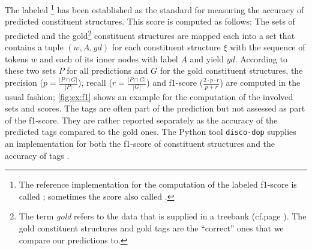 \documentclass[../document.tex]{subfiles}
\begin{document}
    The labeled \footnote{
        The reference implementation for the computation of the labeled f1-score is called  \citep{Black91}; sometimes the score also called .
    } \citep{Black91,Col97} has been established as the standard for measuring the accuracy of predicted constituent structures.
    This score is computed as follows:
    The sets of predicted and the gold\footnote{
        The term \emph{gold} refers to the data that is supplied in a treebank (cf.\@ page \pageref{pg:def:gold}).
        The gold constituent structures and gold  tags are the ``correct'' ones  that we compare our predictions to.
    } constituent structures are mapped each into a set that contains a tuple \((w, A, \mathit{yd})\) for each constituent structure \(\xi\) with the sequence of tokens \(w\) and each of its inner nodes with label \(A\) and yield \(\mathit{yd}\).
    According to these two sets \(P\) for all predictions and \(G\) for the gold constituent structures, the precision (\(p = \frac{|P \cap G|}{|P|}\)), recall (\(r = \frac{|P \cap G|}{|G|}\)) and f1-score (\(\frac{2\cdot p\cdot r}{p + r}\)) are computed in the usual fashion; \cref{fig:ex:f1} shows an example for the computation of the involved sets and scores.
    The  tags are often part of the prediction but not assessed as part of the f1-score.
    They are rather reported separately as the accuracy of the predicted  tags compared to the gold ones.
    The Python tool \texttt{disco-dop} supplies an implementation for both the f1-score of constituent structures and the accuracy of  tags \citep{CraSchBod16}.
\end{document}
